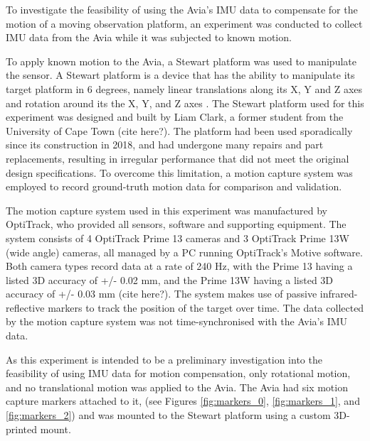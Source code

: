 To investigate the feasibility of using the Avia's \ac{IMU} data to compensate for the motion of a moving observation platform, an experiment was conducted to collect \ac{IMU} data from the Avia while it was subjected to known motion.

To apply known motion to the Avia, a Stewart platform was used to manipulate the sensor. A Stewart platform is a device that has the ability to manipulate its target platform in 6 degrees, namely linear translations along its X, Y and Z axes and rotation around its the X, Y, and Z axes \cite{stewartPlatformSixDegrees1965}. The Stewart platform used for this experiment was designed and built by Liam Clark, a former student from the University of Cape Town (cite here?). The platform had been used sporadically since its construction in 2018, and had undergone many repairs and part replacements, resulting in irregular performance that did not meet the original design specifications. To overcome this limitation, a motion capture system was employed to record ground-truth motion data for comparison and validation.

The motion capture system used in this experiment was manufactured by OptiTrack, who provided all sensors, software and supporting equipment. The system consists of 4 OptiTrack Prime 13 cameras and 3 OptiTrack Prime 13W (wide angle) cameras, all managed by a PC running OptiTrack's Motive software. Both camera types record data at a rate of 240 Hz, with the Prime 13 having a listed 3D accuracy of +/- 0.02 mm, and the Prime 13W having a listed 3D accuracy of +/- 0.03 mm (cite here?). The system makes use of passive infrared-reflective markers to track the position of the target over time. The data collected by the motion capture system was not time-synchronised with the Avia's \ac{IMU} data.

As this experiment is intended to be a preliminary investigation into the feasibility of using \ac{IMU} data for motion compensation, only rotational motion, and no translational motion was applied to the Avia. The Avia had six motion capture markers attached to it, (see Figures \ref{fig:markers_0}, \ref{fig:markers_1}, and \ref{fig:markers_2}) and was mounted to the Stewart platform using a custom 3D-printed mount.


